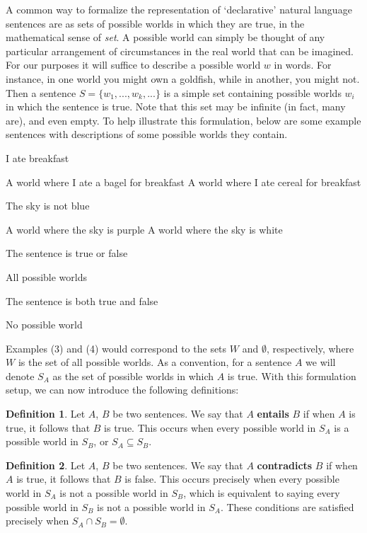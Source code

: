 \documentclass[a4paper, 12pt]{article}
\theoremstyle{definition}
\newtheorem{definition}{Definition}[section]
\begin{document}
A common way to formalize the representation of `declarative' natural language sentences are as sets of possible worlds in which they are true, in the mathematical sense of \textit{set}. A possible world can simply be thought of any particular arrangement of circumstances in the real world that can be imagined. For our purposes it will suffice to describe a possible world $w$ in words. For instance, in one world you might own a goldfish, while in another, you might not. Then a sentence $S = \{w_1, ..., w_k, ...\}$ is a simple set containing possible worlds $w_i$ in which the sentence is true. Note that this set may be infinite (in fact, many are), and even empty. To help illustrate this formulation, below are some example sentences with descriptions of some possible worlds they contain.

\begin{exe}
\ex I ate breakfast
	\begin{xlist} 
		\ex A world where I ate a bagel for breakfast
		\ex A world where I ate cereal for breakfast
	\end{xlist}
\ex The sky is not blue
	\begin{xlist} 
		\ex A world where the sky is purple
		\ex A world where the sky is white
	\end{xlist}
\ex The sentence is true or false
	\begin{xlist}
		\ex All possible worlds
	\end{xlist}
\ex The sentence is both true and false
\begin{xlist}
	\ex No possible world
\end{xlist}
\end{exe}

Examples (3) and (4) would correspond to the sets $W$ and $\emptyset$, respectively, where $W$ is the set of all possible worlds. As a convention, for a sentence $A$ we will denote $S_A$ as the set of possible worlds in which $A$ is true. With this formulation setup, we can now introduce the following definitions:

\begin{definition}
Let $A$, $B$ be two sentences. We say that $A$ \textbf{entails} $B$ if when $A$ is true, it follows that $B$ is true. This occurs when every possible world in $S_A$ is a possible world in $S_B$, or $S_A \subseteq S_B$. \end{definition}

\begin{definition}
	Let $A$, $B$ be two sentences. We say that $A$ \textbf{contradicts} $B$ if when $A$ is true, it follows that $B$ is false. This occurs precisely when every possible world in $S_A$ is not a possible world in $S_B$, which is equivalent to saying every possible world in $S_B$ is not a possible world in $S_A$. These conditions are satisfied precisely when $S_A \cap S_B = \emptyset$.
\end{definition}
\end{document}
